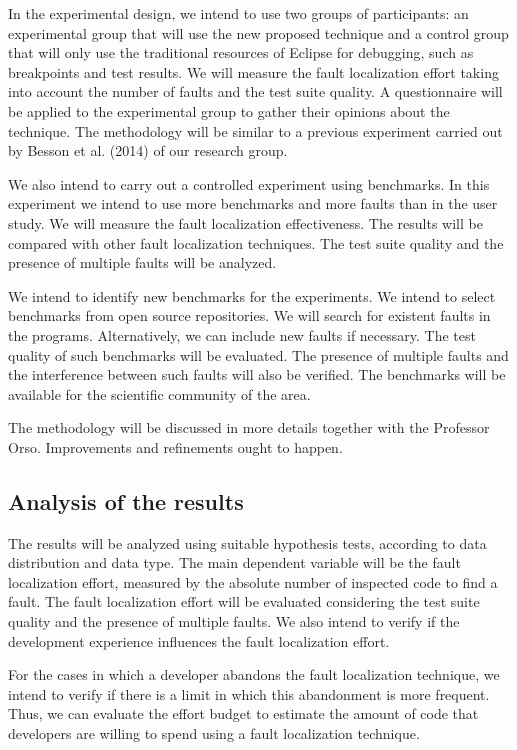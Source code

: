 \documentclass[12pt,a4paper,espaco=umemeio,noindentfirst,oneside,openany,tocpage=plain,pnumromarab,ruledheader,time,anapcustomindent]{sty/abnt}
\begin{document}
In the experimental design, we intend to use two groups of participants: an experimental group that will use the new proposed 
technique and a control group that will only use the traditional resources of Eclipse for debugging, such as breakpoints and 
test results. We will measure the fault localization effort taking into account the number of faults and the test suite quality. 
A questionnaire will be applied to the experimental group to gather their opinions about the technique. The methodology will be 
similar to a previous experiment carried out by Besson et al. (2014) \cite{besson2014} of our research group.

We also intend to carry out a controlled experiment using benchmarks. In this experiment we intend to use more benchmarks and 
more faults than in the user study. We will measure the fault localization effectiveness. The results will be compared with 
other fault localization techniques. The test suite quality and the presence of multiple faults will be analyzed.

We intend to identify new benchmarks for the experiments. We intend to select benchmarks from open source repositories. 
We will search for existent faults in the programs. Alternatively, we can include new faults if necessary.
The test quality of such benchmarks will be evaluated. The presence of multiple faults and the interference between such 
faults will also be verified. The benchmarks will be available for the scientific community of the area.

The methodology will be discussed in more details together with the Professor Orso. Improvements and refinements 
ought to happen.


\subsection{Analysis of the results}
\label{analysis}

The results will be analyzed using suitable hypothesis tests, according to data distribution and data type.
The main dependent variable will be the fault localization effort, measured by the absolute number of inspected code to 
find a fault. The fault localization effort will be evaluated considering the test suite quality and the presence of multiple faults. 
We also intend to verify if the development experience influences the fault localization effort.

For the cases in which a developer abandons the fault localization technique, we intend to verify if there is a limit in which this abandonment
is more frequent. Thus, we can evaluate the effort budget to estimate the amount of code that developers are willing to spend using a 
fault localization technique.
\end{document}
